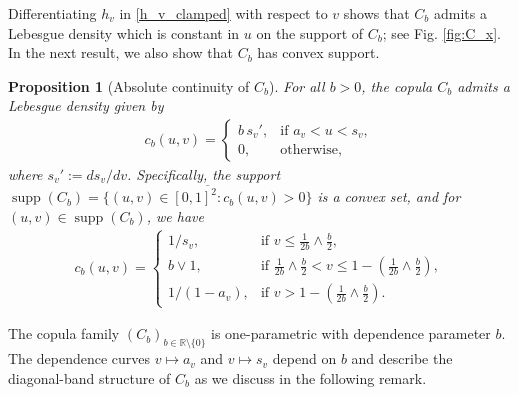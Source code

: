 \documentclass{article}
\theoremstyle{plain}
\newtheorem{proposition}{Proposition}
\theoremstyle{definition}
\newcommand{\R}{\mathbb{R}}
\newcommand{\supp}{\mathop{\mathrm{supp}}}
\begin{document}
Differentiating \(h_v\) in \eqref{h_v_clamped} with respect to \(v\) shows that \(C_b\) admits a Lebesgue density which is constant in \(u\) on the support of \(C_b\); see Fig. \ref{fig:C_x}. In the next result, we also show that \(C_b\) has convex support.

\begin{proposition}[Absolute continuity of \(C_b\)]\label{propabscont}
    For all \(b>0\), the copula \(C_b\) admits a Lebesgue density given by
    \begin{align}\label{eq:density_cb}
        c_b(u,v) = \begin{cases}
            b\,s_v', & \text{if } a_v < u < s_v, \\
            0, & \text{otherwise},
        \end{cases}
    \end{align}
    where \(s_v':= d s_v / dv\).
    Specifically, the support \(\supp(C_b) = \overline{\{(u,v) \in [0,1]^2 : c_b(u,v) > 0\}}\) is a convex set, and for \((u,v)\in \supp(C_b)\), we have
    \begin{align}\label{eqpropabscont}
        c_b(u,v) = \begin{cases}
            1/s_v, & \text{if } v \le \frac{1}{2b}\wedge\frac{b}{2}, \\
            b\vee 1, & \text{if } \frac{1}{2b}\wedge\frac{b}{2} < v \le 1 - (\frac{1}{2b}\wedge\frac{b}{2}), \\
            1/(1-a_v), & \text{if } v > 1 - (\frac{1}{2b}\wedge\frac{b}{2}).
        \end{cases}
    \end{align}
\end{proposition}

The copula family \((C_b)_{b\in \R\setminus \{0\}}\) is one-parametric with dependence parameter \(b\). The dependence curves \(v\mapsto a_v\) and \(v\mapsto s_v\) depend on \(b\) and describe the diagonal-band structure of \(C_b\) as we discuss in the following remark.
\end{document}
